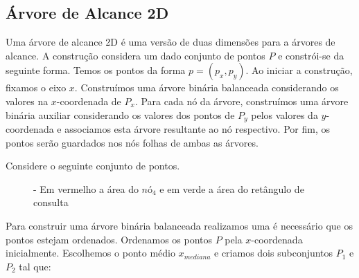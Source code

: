 \subsection{Árvore de Alcance 2D}
Uma árvore de alcance 2D é uma versão de duas dimensões para a árvores de alcance. A construção considera
um dado conjunto de pontos $P$ e constrói-se da seguinte forma.
Temos os pontos da forma $p = (p_x, p_y)$. Ao iniciar a construção, fixamos o eixo $x$.
Construímos uma árvore binária balanceada considerando os valores na $x$-coordenada de $P_x$. Para cada nó da
árvore, construímos uma árvore binária auxiliar considerando os valores dos pontos de $P_y$ pelos valores 
da $y$-coordenada e associamos esta árvore resultante ao nó respectivo.
Por fim, os pontos serão guardados nos nós folhas de ambas as árvores.

Considere o seguinte conjunto de pontos.
\begin{figure}[H]
    \caption{\label{fig:Fig_34} - Em vermelho a área do $nó_4$ e em verde a área do retângulo de consulta}
\centering


\end{figure}

Para construir uma árvore binária balanceada realizamos uma é necessário que os pontos estejam ordenados.
Ordenamos os pontos $P$ pela $x$-coordenada inicialmente. Escolhemos o ponto médio $x_{mediana}$ e
criamos dois subconjuntos $P_1$ e $P_2$ tal que:

